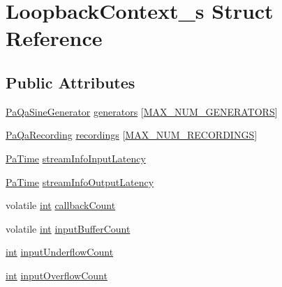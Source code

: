 \hypertarget{struct_loopback_context__s}{}\section{Loopback\+Context\+\_\+s Struct Reference}
\label{struct_loopback_context__s}
\subsection*{Public Attributes}
\begin{DoxyCompactItemize}
\item 
\hyperlink{audio__analyzer_8h_a54a1c7f8306dd7ec9c736d2e81681f03}{Pa\+Qa\+Sine\+Generator} \hyperlink{struct_loopback_context__s_af5271da39a934e3478a74f6b4b7ec144}{generators} \mbox{[}\hyperlink{paqa_8c_a71b4055b49b141f60926e6ecd501a919}{M\+A\+X\+\_\+\+N\+U\+M\+\_\+\+G\+E\+N\+E\+R\+A\+T\+O\+RS}\mbox{]}
\item 
\hyperlink{audio__analyzer_8h_ad8dbda49a320a7e18ce4215416afd9a7}{Pa\+Qa\+Recording} \hyperlink{struct_loopback_context__s_ad1c82c2c4394aed28cbc6b2c4a5b66dc}{recordings} \mbox{[}\hyperlink{paqa_8c_a0b2bc279100a83d537fea49d58f9f497}{M\+A\+X\+\_\+\+N\+U\+M\+\_\+\+R\+E\+C\+O\+R\+D\+I\+N\+GS}\mbox{]}
\item 
\hyperlink{portaudio_8h_af17a7e6d0471a23071acf8dbd7bbe4bd}{Pa\+Time} \hyperlink{struct_loopback_context__s_ac455ac012535f985c53365feb0f91859}{stream\+Info\+Input\+Latency}
\item 
\hyperlink{portaudio_8h_af17a7e6d0471a23071acf8dbd7bbe4bd}{Pa\+Time} \hyperlink{struct_loopback_context__s_a043f29ff78c8aad99aaf609a45ebe1aa}{stream\+Info\+Output\+Latency}
\item 
volatile \hyperlink{xmltok_8h_a5a0d4a5641ce434f1d23533f2b2e6653}{int} \hyperlink{struct_loopback_context__s_a692f77b0071a2c85de22b37da5d58c68}{callback\+Count}
\item 
volatile \hyperlink{xmltok_8h_a5a0d4a5641ce434f1d23533f2b2e6653}{int} \hyperlink{struct_loopback_context__s_ab3ea16136ef5a74d38292545cba5f011}{input\+Buffer\+Count}
\item 
\hyperlink{xmltok_8h_a5a0d4a5641ce434f1d23533f2b2e6653}{int} \hyperlink{struct_loopback_context__s_ac05faa6902eadbdff7964878907727a3}{input\+Underflow\+Count}
\item 
\hyperlink{xmltok_8h_a5a0d4a5641ce434f1d23533f2b2e6653}{int} \hyperlink{struct_loopback_context__s_ae577ec80331ca93c1a4b9bd47dedd503}{input\+Overflow\+Count}
\item 

\end{DoxyCompactItemize}
